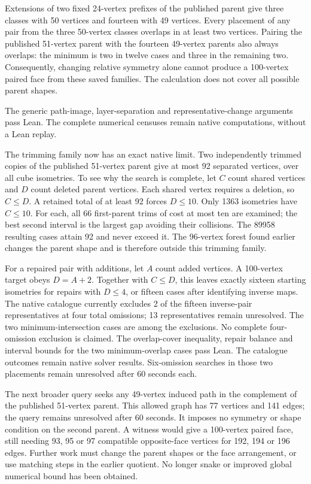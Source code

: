 \documentclass[11pt,a4paper]{article}
\begin{document}
Extensions of two fixed 24-vertex prefixes of the published parent
give three classes with 50 vertices and fourteen with 49 vertices.
Every placement of any pair from the three 50-vertex classes overlaps
in at least two vertices. Pairing the published 51-vertex parent with
the fourteen 49-vertex parents also always overlaps: the minimum is
two in twelve cases and three in the remaining two. Consequently,
changing relative symmetry alone cannot produce a 100-vertex paired
face from these saved families. The calculation does not cover all
possible parent shapes.

The generic path-image, layer-separation and representative-change
arguments pass Lean. The complete numerical censuses remain native
computations, without a Lean replay.

The trimming family now has an exact native limit. Two independently
trimmed copies of the published 51-vertex parent give at most 92
separated vertices, over all cube isometries. To see why the search is
complete, let $C$ count shared vertices and $D$ count deleted parent
vertices. Each shared vertex requires a deletion, so $C\le D$.
A retained total of at least 92 forces $D\le10$. Only 1363 isometries
have $C\le10$. For each, all 66 first-parent trims of cost at most ten
are examined; the best second interval is the largest gap avoiding
their collisions. The 89958 resulting cases attain 92 and never exceed it.
The 96-vertex forest found earlier changes the parent shape and is
therefore outside this trimming family.

For a repaired pair with additions, let $A$ count added vertices.
A 100-vertex target obeys $D=A+2$. Together with $C\le D$, this leaves
exactly sixteen starting isometries for repairs with $D\le4$, or fifteen
cases after identifying inverse maps. The native catalogue currently excludes 2 of the fifteen inverse-pair representatives at four total omissions; 13 representatives remain unresolved. The two minimum-intersection cases are among the exclusions. No complete four-omission exclusion is claimed.
The overlap-cover inequality, repair balance and interval bounds for
the two minimum-overlap cases pass Lean. The catalogue outcomes remain
native solver results. Six-omission searches in those two placements
remain unresolved after 60 seconds each.


The next broader query seeks any 49-vertex induced path in the
complement of the published 51-vertex parent. This allowed graph has
77 vertices and 141 edges; the query remains unresolved after 60 seconds.
It imposes no symmetry or shape condition on the second parent.
A witness would give a 100-vertex paired face, still needing 93,
95 or 97 compatible opposite-face vertices for 192, 194 or 196 edges.
Further work must change the parent shapes or the face arrangement,
or use matching steps in the earlier quotient. No longer snake or
improved global numerical bound has been obtained.
\end{document}
